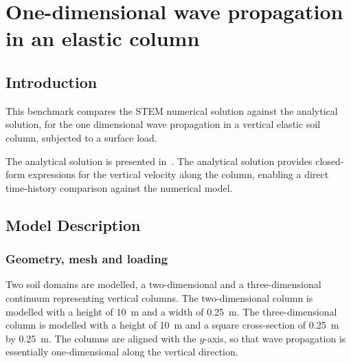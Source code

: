 \chapter{One-dimensional wave propagation in an elastic column} \label{ch:one_dim_wave_prop}

\section{Introduction}
This benchmark compares the STEM numerical solution against the analytical solution,
for the one dimensional wave propagation in a vertical elastic soil column, subjected to a surface load.

The analytical solution is presented in~\cite{Verruijt_2010}.
The analytical solution provides closed-form expressions for the vertical velocity along the column,
enabling a direct time-history comparison against the numerical model.

\section{Model Description}

\subsection{Geometry, mesh and loading}
Two soil domains are modelled, a two-dimensional and a three-dimensional continuum representing vertical columns.
The two-dimensional column is modelled with a height of \qty{10}{\meter} and a width of \qty{0.25}{\meter}.
The three-dimensional column is modelled with a height of \qty{10}{\meter} and a square cross-section of
\qty{0.25}{\meter} by \qty{0.25}{\meter}.
The columns are aligned with the $y$-axis, so that wave propagation is essentially one-dimensional along
the vertical direction.


